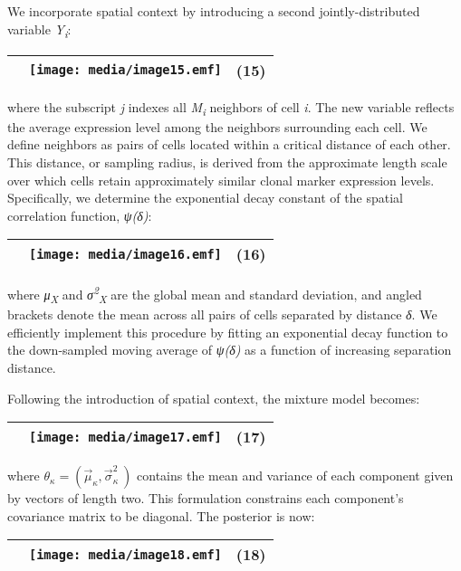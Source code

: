 We incorporate spatial context by introducing a second jointly-distributed variable \emph{Y\textsubscript{i}}:

\begin{longtable}[]{@{}lll@{}}
\toprule
& \texttt{[image: media/image15.emf]} & (15)\tabularnewline
\bottomrule
\end{longtable}

where the subscript \emph{j} indexes all \emph{M\textsubscript{i}} neighbors of cell \emph{i}. The new variable reflects the average expression level among the neighbors surrounding each cell. We define neighbors as pairs of cells located within a critical distance of each other. This distance, or sampling radius, is derived from the approximate length scale over which cells retain approximately similar clonal marker expression levels. Specifically, we determine the exponential decay constant of the spatial correlation function, \emph{ψ(δ)}:

\begin{longtable}[]{@{}lll@{}}
\toprule
& \texttt{[image: media/image16.emf]} & (16)\tabularnewline
\bottomrule
\end{longtable}

where \emph{μ\textsubscript{X}} and \emph{σ\textsuperscript{2}\textsubscript{X}} are the global mean and standard deviation, and angled brackets denote the mean across all pairs of cells separated by distance \emph{δ}. We efficiently implement this procedure by fitting an exponential decay function to the down-sampled moving average of \emph{ψ(δ)} as a function of increasing separation distance.

Following the introduction of spatial context, the mixture model becomes:

\begin{longtable}[]{@{}lll@{}}
\toprule
& \texttt{[image: media/image17.emf]} & (17)\tabularnewline
\bottomrule
\end{longtable}

where \(\theta_{\kappa} = ({\overrightarrow{\mu}}_{\kappa},{\overrightarrow{\sigma}}_{\kappa}^{2}\ )\) contains the mean and variance of each component given by vectors of length two. This formulation constrains each component's covariance matrix to be diagonal. The posterior is now:

\begin{longtable}[]{@{}lll@{}}
\toprule
& \texttt{[image: media/image18.emf]} & (18)\tabularnewline
\bottomrule
\end{longtable}

